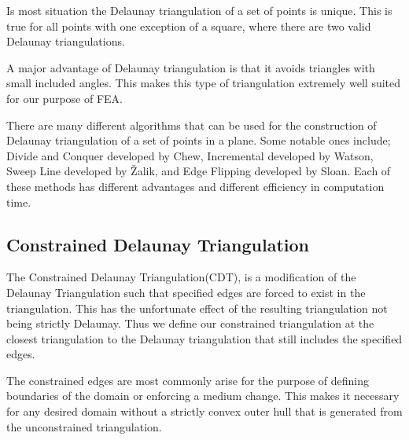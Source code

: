 \documentclass[../fem.tex]{subfiles}
\begin{document}
\begin{Figure}
   \begin{center}
     
   \end{center}
\end{Figure}

Is most situation the Delaunay triangulation of a set of points is unique. This
is true for all points with one exception of a square, where there are two
valid Delaunay triangulations.

A major advantage of Delaunay triangulation is that it avoids triangles with
small included angles. This makes this type of triangulation extremely well
suited for our purpose of FEA.

There are many different algorithms that can be used for the construction of
Delaunay triangulation of a set of points in a plane. Some notable ones
include; Divide and Conquer developed by Chew\cite{C_CDT}, Incremental
developed by Watson, Sweep Line developed by \v{Z}alik\cite{Z_DT}\cite{DZ_CDT},
and Edge Flipping developed by Sloan\cite{S_DT}\cite{S_CDT}. Each of these
methods has different advantages and different efficiency in computation time.

\subsection{Constrained Delaunay Triangulation}%
\label{sub:constrained_delaunay_triangulation}

The Constrained Delaunay Triangulation(CDT), is a modification of the Delaunay
Triangulation such that specified edges are forced to exist in the
triangulation. This has the unfortunate effect of the resulting triangulation
not being strictly Delaunay. Thus we define our constrained triangulation at
the closest triangulation to the Delaunay triangulation that still includes the
specified edges.

\begin{Figure}
  \begin{center}
    
  \end{center}
\end{Figure}

The constrained edges are most commonly arise for the purpose of defining
boundaries of the domain or enforcing a medium change. This makes it necessary
for any desired domain without a strictly convex outer hull that is generated
from the unconstrained triangulation.
\end{document}

